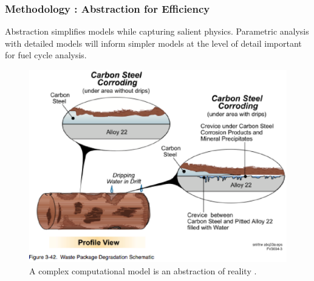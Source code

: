 \begin{frame}[ctb!]
  \frametitle{Methodology : Abstraction for Efficiency}

  \begin{minipage}{0.49\textwidth}
      Abstraction simplifies models while capturing salient physics. 
      Parametric analysis with detailed models will inform simpler models at the 
      level of detail important for fuel cycle analysis.
    \begin{figure}[h!]
        \includegraphics[width=\textwidth]{reality.eps}
      \caption{A complex computational model is an abstraction of reality 
      \cite{doe_viability_1998}.}
      \label{fig:reality}
    \end{figure}
  \end{minipage}
  \hspace{0.01cm}
  \begin{minipage}{0.49\textwidth}
    \begin{figure}[h!]

\end{figure}
\end{minipage}
\end{frame}
